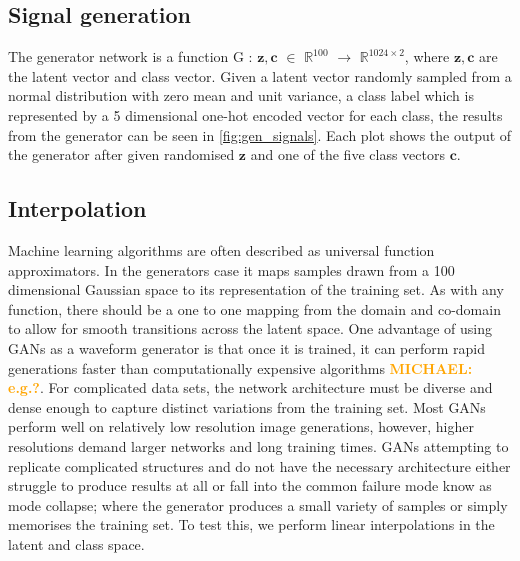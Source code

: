 \documentclass[12pt]{iopart}
\newcommand{\michael}[1]{\textbf{\textcolor{orange}{MICHAEL: #1}}}
\begin{document}
\subsection{Signal generation}
The generator network is a function G : $\mathbf{z},\mathbf{c} $ $\in$ $\mathbb{R}^{100}$ $\to$ $\mathbb{R}^{1024\times2}$, where $\mathbf{z},\mathbf{c}$ are the latent vector and class vector. Given a latent vector randomly sampled from a normal distribution with zero mean and unit variance, a class label which is represented by a 5 dimensional one-hot encoded vector for each class, the results from the generator can be seen in \cref{fig:gen_signals}. Each plot shows the output of the generator after given randomised $\mathbf{z}$ and one of the five class vectors $\mathbf{c}$.

\subsection{Interpolation}
Machine learning algorithms are often described as universal function approximators. In the generators case it maps samples drawn from a 100 dimensional Gaussian space to its representation of the training set. As with any function, there should be a one to one mapping from the domain and co-domain to allow for smooth transitions across the latent space. One advantage of using GANs as a waveform generator is that once it is trained, it can perform rapid generations faster than computationally
expensive algorithms \michael{e.g.?}. For complicated data sets, the network architecture must be diverse and dense enough to capture distinct variations from the training set. Most GANs perform well on relatively low resolution image generations, however, higher resolutions demand larger networks and long training times. GANs attempting to replicate complicated structures and do not have the necessary architecture either struggle to produce results at all or fall into the common failure mode know as mode collapse; where the generator produces a small variety of samples or simply memorises the training set. To test this, we perform linear interpolations in the latent and class space. 
\end{document}
